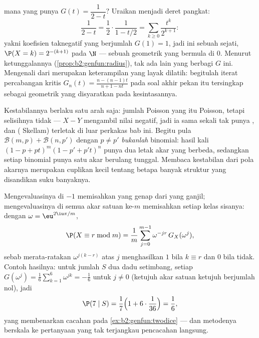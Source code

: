\begin{example}\label{ex:b2:genfun:identify}
 mana yang punya $G(t) = \dfrac1{2 - t}$? Uraikan menjadi deret
pangkat:
\[
\frac{1}{2 - t} = \frac12\cdot\frac1{1 - t/2}
= \sum_{k\geq0}\frac{t^k}{2^{k+1}} :
\]
yakni koefisien taknegatif yang berjumlah $G(1) = 1$, jadi ini sebuah
 sejati, $\P(X = k) = 2^{-(k+1)}$ pada $\N$ --- sebuah
 geometrik yang bermula di $0$. Menurut ketunggalannya
(\cref{prop:b2:genfun:radius}), tak ada  lain yang berbagi
$G$ ini. Mengenali  dari  merupakan
keterampilan yang layak dilatih: begitulah iterat percabangan
kritis $G_n(t) = \frac{n - (n-1)t}{n+1 - nt}$ pada
soal akhir pekan itu tersingkap sebagai  geometrik yang
disyaratkan pada kesintasannya.
\end{example}

\begin{remark}
Kestabilannya berlaku satu arah saja: jumlah Poisson yang  itu
Poisson, tetapi selisihnya tidak --- $X - Y$ mengambil nilai
negatif, jadi ia sama sekali tak punya , dan 
( Skellam) terletak di luar perkakas bab ini.
Begitu pula $\mathcal B(m, p) + \mathcal B(n, p')$ dengan
$p \neq p'$ \emph{bukanlah} binomial: hasil kali $(1 - p +
pt)^m(1 - p' + p't)^n$ punya dua letak akar yang berbeda, sedangkan
setiap  binomial punya satu akar berulang tunggal. Membaca
kestabilan dari pola akarnya merupakan cuplikan kecil tentang betapa banyak
struktur yang disandikan suku banyaknya.
\end{remark}

\begin{remark}
Mengevaluasinya di $-1$ memisahkan yang genap dari yang ganjil; mengevaluasinya di semua
akar satuan ke-$m$ memisahkan setiap kelas sisanya: dengan
$\omega = \eu^{2\iu\pi/m}$,
\[
\P(X \equiv r \bmod m)
= \frac1m\sum_{j=0}^{m-1}\omega^{-jr}\,G_X(\omega^j),
\]
sebab merata-ratakan $\omega^{j(k-r)}$ atas $j$ menghasilkan $1$ bila $k
\equiv r$ dan $0$ bila tidak. Contoh hasilnya: untuk jumlah $S$
dua dadu setimbang, setiap $G(\omega^j) = \frac16\sum_{k=1}^6
\omega^{jk} = -\frac16$ untuk $j \neq 0$ (ketujuh akar
satuan ketujuh berjumlah nol), jadi
\[
\P(7 \mid S) = \frac17\Bigl(1 +
6\cdot\frac1{36}\Bigr) = \frac16 ,
\]
yang membenarkan cacahan pada \cref{ex:b2:genfun:twodice} ---
dan metodenya berskala ke pertanyaan yang tak terjangkau
pencacahan langsung.
\end{remark}

